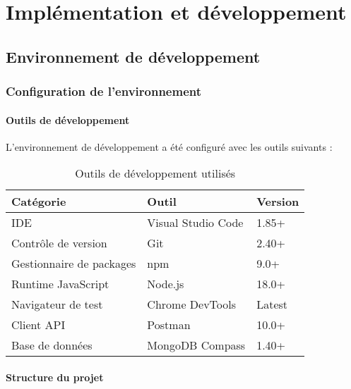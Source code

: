 \chapter{Implémentation et développement}

\section{Environnement de développement}

\subsection{Configuration de l'environnement}

\subsubsection{Outils de développement}

L'environnement de développement a été configuré avec les outils suivants :

\begin{table}[H]
\centering
\caption{Outils de développement utilisés}
\begin{tabular}{|l|l|l|}
\hline
\textbf{Catégorie} & \textbf{Outil} & \textbf{Version} \\
\hline
IDE & Visual Studio Code & 1.85+ \\
Contrôle de version & Git & 2.40+ \\
Gestionnaire de packages & npm & 9.0+ \\
Runtime JavaScript & Node.js & 18.0+ \\
Navigateur de test & Chrome DevTools & Latest \\
Client API & Postman & 10.0+ \\
Base de données & MongoDB Compass & 1.40+ \\
\hline
\end{tabular}
\end{table}

\subsubsection{Structure du projet}

